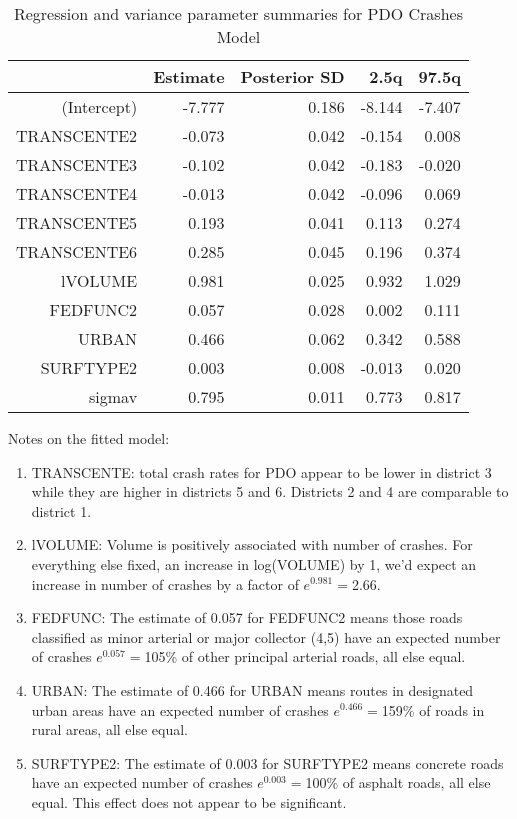 \documentclass[a4paper]{article}\usepackage[]{graphicx}\usepackage[]{color}
\begin{document}
\begin{table}[ht]
\centering
\begin{tabular}{rrrrr}
  \hline
 & Estimate & Posterior SD & 2.5q & 97.5q \\ 
  \hline
(Intercept) & -7.777 & 0.186 & -8.144 & -7.407 \\ 
  TRANSCENTE2 & -0.073 & 0.042 & -0.154 & 0.008 \\ 
  TRANSCENTE3 & -0.102 & 0.042 & -0.183 & -0.020 \\ 
  TRANSCENTE4 & -0.013 & 0.042 & -0.096 & 0.069 \\ 
  TRANSCENTE5 & 0.193 & 0.041 & 0.113 & 0.274 \\ 
  TRANSCENTE6 & 0.285 & 0.045 & 0.196 & 0.374 \\ 
  lVOLUME & 0.981 & 0.025 & 0.932 & 1.029 \\ 
  FEDFUNC2 & 0.057 & 0.028 & 0.002 & 0.111 \\ 
  URBAN & 0.466 & 0.062 & 0.342 & 0.588 \\ 
  SURFTYPE2 & 0.003 & 0.008 & -0.013 & 0.020 \\ 
  sigmav & 0.795 & 0.011 & 0.773 & 0.817 \\ 
   \hline
\end{tabular}
\caption{Regression and variance parameter summaries for PDO Crashes Model} 
\label{pdocrash}
\end{table}


Notes on the fitted model:

\begin{enumerate}
\item
TRANSCENTE: total crash rates for PDO appear to be lower in district 3 while they are higher in districts 5 and 6. Districts 2 and 4 are comparable to district 1.

\item
lVOLUME: Volume is positively associated with number of crashes. For everything else fixed, an increase in log(VOLUME) by 1, we'd expect an increase in number of crashes by a factor of $e^{0.981}=$2.66.

\item
FEDFUNC: The estimate of 0.057 for FEDFUNC2 means those roads classified as minor arterial or major collector (4,5) have an expected number of crashes $e^{0.057}=$105\% of other principal arterial roads, all else equal. 

\item
URBAN: The estimate of 0.466 for URBAN means routes in designated urban areas have an expected number of crashes $e^{0.466}=$159\% of roads in rural areas, all else equal.

\item
SURFTYPE2: The estimate of 0.003 for SURFTYPE2 means concrete roads have an expected number of crashes $e^{0.003}=$100\% of asphalt roads, all else equal. This effect does not appear to be significant.

\end{enumerate}
\end{document}
